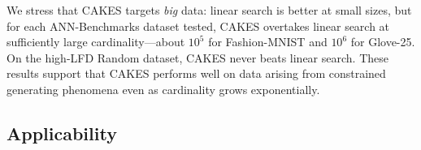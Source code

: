We stress that CAKES targets \emph{big} data: linear search is better at small sizes, but for each ANN-Benchmarks dataset tested, CAKES overtakes linear search at sufficiently large cardinality—about $10^{5}$ for Fashion-MNIST and $10^{6}$ for Glove-25. On the high-LFD Random dataset, CAKES never beats linear search. These results support that CAKES performs well on data arising from constrained generating phenomena even as cardinality grows exponentially.





\subsection{Applicability}

